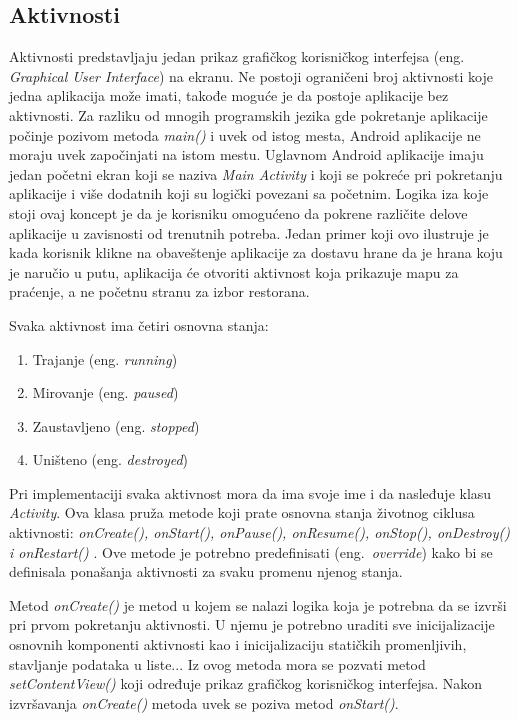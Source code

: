 \documentclass[android.tex]{subfiles}
\begin{document}
\subsection{Aktivnosti}
Aktivnosti predstavljaju jedan prikaz grafičkog korisničkog interfejsa (eng. \textit{Graphical User Interface}) na ekranu. Ne postoji ograničeni broj aktivnosti koje jedna aplikacija može imati, takođe moguće je da postoje aplikacije bez aktivnosti. Za razliku od mnogih programskih jezika gde pokretanje aplikacije počinje pozivom metoda \textit{main()} i uvek od istog mesta, Android aplikacije ne moraju uvek započinjati na istom mestu. Uglavnom Android aplikacije imaju jedan početni ekran koji se naziva \textit{Main Activity} i  koji se pokreće pri pokretanju aplikacije i više dodatnih koji su logički povezani sa početnim. Logika iza koje stoji ovaj koncept je da je korisniku omogućeno da pokrene različite delove aplikacije u zavisnosti od trenutnih potreba. Jedan primer koji ovo ilustruje je kada korisnik klikne na obaveštenje aplikacije za dostavu hrane da je hrana koju je naručio u putu, aplikacija će otvoriti aktivnost koja prikazuje mapu za praćenje, a ne početnu stranu za izbor restorana.

Svaka aktivnost ima četiri osnovna stanja: 
\begin{enumerate}
    \item Trajanje (eng. \textit{running})
    \item Mirovanje (eng. \textit{paused})
    \item Zaustavljeno (eng. \textit{stopped})
    \item Uništeno (eng. \textit{destroyed})
\end{enumerate}
Pri implementaciji svaka aktivnost mora da ima svoje ime i da nasleđuje klasu \textit{Activity}. Ova klasa pruža metode koji prate osnovna stanja životnog ciklusa aktivnosti: \textit{onCreate(), onStart(), onPause(), onResume(), onStop(), onDestroy() i onRestart()} \cite{book:and9cookbook}. Ove metode je potrebno predefinisati (eng.~\textit{override}) kako bi se definisala ponašanja aktivnosti za svaku promenu njenog stanja. 

Metod \textit{onCreate()} je metod u kojem se nalazi logika koja je potrebna da se izvrši pri prvom pokretanju aktivnosti. U njemu je potrebno uraditi sve inicijalizacije osnovnih komponenti aktivnosti kao i inicijalizaciju statičkih promenljivih, stavljanje podataka u liste... Iz ovog metoda mora se pozvati metod \textit{setContentView()} koji određuje prikaz grafičkog korisničkog interfejsa. Nakon izvršavanja \textit{onCreate() }metoda uvek se poziva metod \textit{onStart()}.
\end{document}
